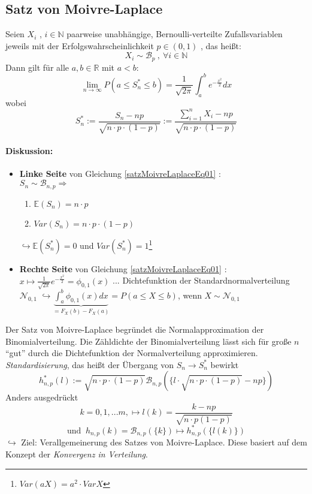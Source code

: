 \documentclass[12pt,a4paper]{article}
\begin{document}
	\subsection{Satz von Moivre-Laplace}
	Seien $X_i$ , $i\in\mathbb{N}$ paarweise unabhängige, Bernoulli-verteilte Zufallsvariablen jeweils mit der Erfolgswahrscheinlichkeit $p\in(0,1)$ , das heißt:
	$$X_i \sim \mathcal{B}_p \: , \: \forall i\in\mathbb{N}$$
	Dann gilt für alle $a,b\in\mathbb{R}$ mit $a<b$:
	\begin{equation}
	\label{satzMoivreLaplaceEq01}
	\lim_{n\to\infty} P(a\leq S_n^{*} \leq b) = \frac{1}{\sqrt{2\pi}} \int_a^b e^{-\frac{x^2}{2}} dx
	\end{equation}
	wobei
	$$S_n^{*} := \frac{S_n - np}{\sqrt{n\cdot p \cdot (1-p)}} := \frac{\sum_{i=1}^n X_i - np}{\sqrt{n\cdot p \cdot (1-p)}}$$
	\paragraph{Diskussion:}
	\begin{itemize}
		\item \textbf{Linke Seite} von Gleichung \ref{satzMoivreLaplaceEq01} : \\
		$S_n \sim \mathcal{B}_{n,p} \Rightarrow$
		\begin{enumerate}
			\item $\mathbb{E}(S_n)=n\cdot p$
			\item $Var(S_n) = n \cdot p \cdot (1-p)$
		\end{enumerate}
		$\hookrightarrow \mathbb{E}(S_n^{*})=0$ und $Var(S_n^{*})=1$\quad \footnote{$Var(aX)=a^2\cdot Var X$}
		\item \textbf{Rechte Seite} von Gleichung \ref{satzMoivreLaplaceEq01} : \\
		$\displaystyle x\longmapsto \frac{1}{\sqrt{2\pi}} e^{-\frac{x^2}{2}} = \phi_{0,1}(x)$  ... Dichtefunktion der Standardnormalverteilung $\mathcal{N}_{0,1}$
		$\displaystyle \hookrightarrow \underbrace{\int_a^b \phi_{0,1} (x)dx}_{=F_X(b)-F_X(a)} = P(a\leq X \leq b)$, wenn $X\sim\mathcal{N}_{0,1}$
	\end{itemize}

	Der Satz von Moivre-Laplace begründet die Normalapproximation der Binomialverteilung. Die Zähldichte der Binomialverteilung lässt sich für große $n$ ``gut'' durch die Dichtefunktion der Normalverteilung approximieren.\\
	\textit{Standardisierung}, das heißt der Übergang von $S_n \rightarrow S_n^{*}$ bewirkt 
	$$h_{n,p}^{*} (l) := \sqrt{n\cdot p \cdot (1-p)} \mathcal{B}_{n,p}(\{l\cdot \sqrt{n\cdot p\cdot (1-p)} -np\})$$
	Anders ausgedrückt
	$$k=0,1,...m, \longmapsto l(k) = \frac{k-np}{\sqrt{n\cdot p(1-p)}}$$
	$$\text{und } \: h_{n,p}(k) = \mathcal{B}_{n,p} (\{k\}) \longmapsto h_{n,p}^{*}(\{l(k)\})$$
	$\hookrightarrow$ Ziel: Verallgemeinerung des Satzes von Moivre-Laplace. Diese basiert auf dem Konzept der \textit{Konvergenz in Verteilung}.
	
\end{document}
